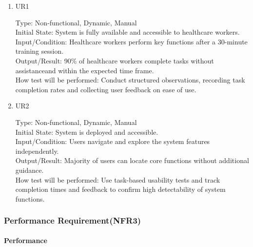 \documentclass[12pt, titlepage]{article}
\begin{document}
\begin{enumerate}
    \item{UR1\\}
    
    Type: Non-functional, Dynamic, Manual\\
    
    Initial State: System is fully available and accessible to healthcare workers.\\
    
    Input/Condition: Healthcare workers perform key functions after a 30-minute training session.\\
    
    Output/Result: 90\% of healthcare workers complete tasks without assistanceand within the expected time frame.\\
    
    How test will be performed: Conduct structured observations, recording task completion rates and collecting user feedback on ease of use.

    \item{UR2\\}
    
    Type: Non-functional, Dynamic, Manual\\
    
    Initial State: System is deployed and accessible.\\
    
    Input/Condition: Users navigate and explore the system features independently.\\
    
    Output/Result: Majority of users can locate core functions without additional guidance.\\
    
    How test will be performed: Use task-based usability tests and track completion times and feedback to confirm high detectability of system functions.
\end{enumerate}

\subsubsection{Performance Requirement(NFR3)}

\paragraph{Performance}
\end{document}
